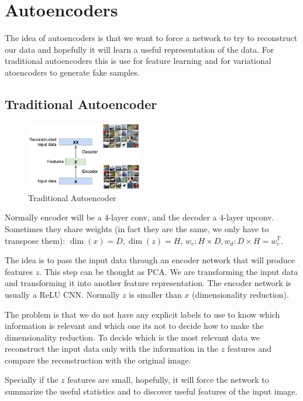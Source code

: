 \chapter{Autoencoders}
The idea of autoencoders is that we want to force a network to try to reconstruct our data and hopefully it will learn a useful representation of the data. For traditional autoencoders this is use for feature learning and for variational atoencoders to generate fake samples.

\section{Traditional Autoencoder}
\begin{figure}[!htb]
  \centering
  \includegraphics[width=0.45\textwidth]{Images/autoencoders/1.png}
  \caption{Traditional Autoencoder}
\end{figure}

Normally encoder will be a 4-layer conv, and the decoder a 4-layer upconv. Sometimes they share weights (in fact they are the same, we only have to transpose them): $\dim(x) = D, \dim(z)=H$, $w_e : H \times D, w_d : D \times H = w_e^T$.

The idea is to pass the input data through an encoder network that will produce features $z$. This step can be thought as PCA. We are transforming the input data and transforming it into another feature representation. The encoder network is usually a ReLU CNN. Normally $z$ is smaller than $x$ (dimensionality reduction).

The problem is that we do not have any explicit labels to use to know which information is relevant and which one its not to decide how to make the dimensionality reduction. To decide which is the most relevant data we reconstruct the input data only with the information in the $z$ features and compare the reconstruction with the original image.

Specially if the $z$ features are small, hopefully, it will force the network to summarize the useful statistics and to discover useful features of the input image.



